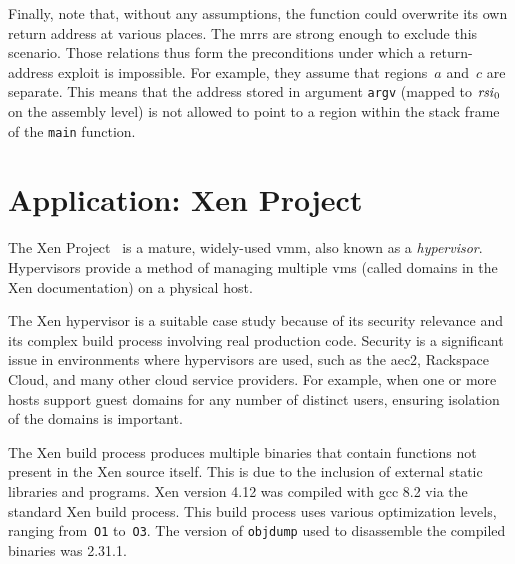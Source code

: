 Finally, note that, without any assumptions,
the function could overwrite its own return address at various places.
The \acp{mrr} are strong enough to exclude this scenario.
Those relations thus form the preconditions
under which a return-address exploit is impossible.%
For example, they assume that regions~$a$ and~$c$ are separate.
This means that the address stored in argument \lstinline[style=C]|argv|
(mapped to $\mathit{rsi}_0$ on the assembly level)
is not allowed to point to a region
within the stack frame of the \lstinline[style=C]|main| function.

\section{Application: Xen Project}\label{se:xen}
The Xen Project~\citep{chisnall2008definitive}%
is a mature, widely-used \ac{vmm}, also known as a \emph{hypervisor}.%
Hypervisors provide a method of managing multiple
\acp{vm} (called domains in the Xen documentation) on a physical host.%

The Xen hypervisor is a suitable case study because of its security relevance%
and its complex build process involving real production code.
Security is a significant issue in environments where hypervisors are used,
such as the \ac{aec2}, Rackspace Cloud, and many other cloud service providers.
For example, when one or more hosts support guest domains
for any number of distinct users,
ensuring isolation of the domains is important.

The Xen build process produces multiple binaries
that contain functions not present in the Xen source itself.
This is due to the inclusion of external static libraries and programs.
Xen version 4.12 was compiled with \ac{gcc} 8.2 via the standard Xen build process.
This build process uses various optimization levels,
ranging from~\texttt{O1} to~\texttt{O3}.
The version of \texttt{objdump} used to disassemble the compiled binaries was 2.31.1.%
%

